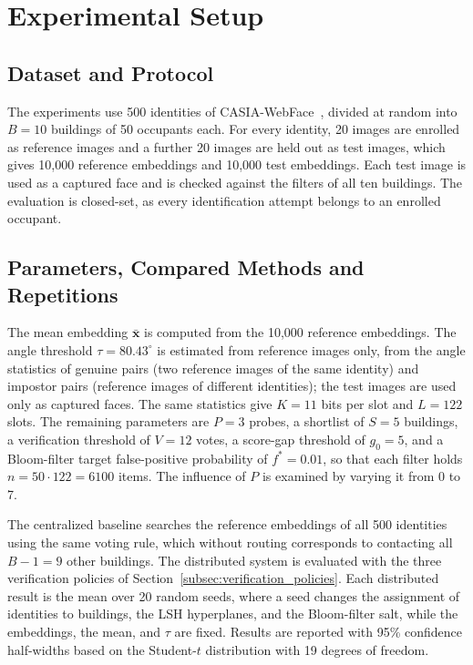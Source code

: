 \documentclass[pdflatex,sn-mathphys-num]{sn-jnl}%
\theoremstyle{thmstyleone}%
\theoremstyle{thmstyletwo}%
\theoremstyle{thmstylethree}%
\begin{document}
\section{Experimental Setup}
\label{sec:setup}

\subsection{Dataset and Protocol}

The experiments use 500 identities of CASIA-WebFace~\cite{yi2014}, divided at random into $B=10$ buildings of 50 occupants each. For every identity, 20 images are enrolled as reference images and a further 20 images are held out as test images, which gives 10,000 reference embeddings and 10,000 test embeddings. Each test image is used as a captured face and is checked against the filters of all ten buildings. The evaluation is closed-set, as every identification attempt belongs to an enrolled occupant.

\subsection{Parameters, Compared Methods and Repetitions}

The mean embedding $\bar{\mathbf{x}}$ is computed from the 10,000 reference embeddings. The angle threshold $\tau=80.43^{\circ}$ is estimated from reference images only, from the angle statistics of genuine pairs (two reference images of the same identity) and impostor pairs (reference images of different identities); the test images are used only as captured faces. The same statistics give $K=11$ bits per slot and $L=122$ slots. The remaining parameters are $P=3$ probes, a shortlist of $S=5$ buildings, a verification threshold of $V=12$ votes, a score-gap threshold of $g_0=5$, and a Bloom-filter target false-positive probability of $f^*=0.01$, so that each filter holds $n=50\cdot122=6100$ items. The influence of $P$ is examined by varying it from 0 to 7.

The centralized baseline searches the reference embeddings of all 500 identities using the same voting rule, which without routing corresponds to contacting all $B-1=9$ other buildings. The distributed system is evaluated with the three verification policies of Section~\ref{subsec:verification_policies}. Each distributed result is the mean over 20 random seeds, where a seed changes the assignment of identities to buildings, the LSH hyperplanes, and the Bloom-filter salt, while the embeddings, the mean, and $\tau$ are fixed. Results are reported with 95\% confidence half-widths based on the Student-$t$ distribution with 19 degrees of freedom.
\end{document}
